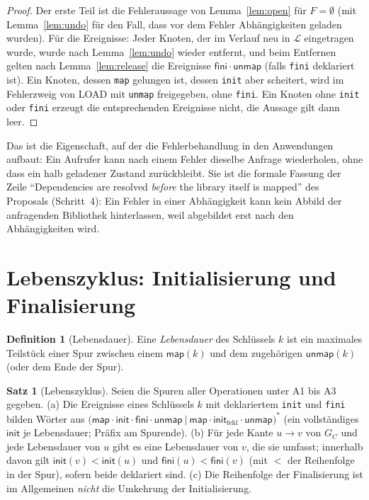 \documentclass[a4paper,12pt,twoside]{report}
\DeclareRobustCommand{\_}{\ifmmode\mbox{\textunderscore}\else\textunderscore\allowbreak{}\fi}
\theoremstyle{definition}
\newtheorem{definition}{Definition}[chapter]
\newtheorem{satz}{Satz}[chapter]
\begin{document}
\begin{proof}
	Der erste Teil ist die Fehleraussage von Lemma~\ref{lem:open} für $F=\emptyset$ (mit Lemma~\ref{lem:undo} für den Fall, dass vor dem Fehler Abhängigkeiten geladen wurden). Für die Ereignisse: Jeder Knoten, der im Verlauf neu in $\mathcal L$ eingetragen wurde, wurde nach Lemma~\ref{lem:undo} wieder entfernt, und beim Entfernen gelten nach Lemma~\ref{lem:release} die Ereignisse $\mathsf{fini}\cdot\mathsf{unmap}$ (falls \texttt{fini} deklariert ist). Ein Knoten, dessen \texttt{map} gelungen ist, dessen \texttt{init} aber scheitert, wird im Fehlerzweig von LOAD mit \texttt{unmap} freigegeben, ohne \texttt{fini}. Ein Knoten ohne \texttt{init} oder \texttt{fini} erzeugt die entsprechenden Ereignisse nicht, die Aussage gilt dann leer.
\end{proof}

Das ist die Eigenschaft, auf der die Fehlerbehandlung in den Anwendungen aufbaut: Ein Aufrufer kann nach einem Fehler dieselbe Anfrage wiederholen, ohne dass ein halb geladener Zustand zurückbleibt. Sie ist die formale Fassung der Zeile ``Dependencies are resolved \emph{before} the library itself is mapped'' des Proposals (Schritt~4): Ein Fehler in einer Abhängigkeit kann kein Abbild der anfragenden Bibliothek hinterlassen, weil abgebildet erst nach den Abhängigkeiten wird.

\section{Lebenszyklus: Initialisierung und Finalisierung}
\label{sec:lebenszyklus}

\begin{definition}[Lebensdauer]
	Eine \emph{Lebensdauer} des Schlüssels $k$ ist ein maximales Teilstück einer Spur zwischen einem $\mathsf{map}(k)$ und dem zugehörigen $\mathsf{unmap}(k)$ (oder dem Ende der Spur).
\end{definition}

\begin{satz}[Lebenszyklus]
	\label{satz:lebenszyklus}
	Seien die Spuren aller Operationen unter A1 bis A3 gegeben. (a) Die Ereignisse eines Schlüssels $k$ mit deklariertem \texttt{init} und \texttt{fini} bilden Wörter aus $\bigl(\mathsf{map}\cdot\mathsf{init}\cdot\mathsf{fini}\cdot\mathsf{unmap}\ \big|\ \mathsf{map}\cdot\mathsf{init}_{\mathrm{fehl}}\cdot\mathsf{unmap}\bigr)^*$ (ein vollständiges $\mathsf{init}$ je Lebensdauer; Präfix am Spurende). (b) Für jede Kante $u\to v$ von $G_C$ und jede Lebensdauer von $u$ gibt es eine Lebensdauer von $v$, die sie umfasst; innerhalb davon gilt $\mathsf{init}(v)<\mathsf{init}(u)$ und $\mathsf{fini}(u)<\mathsf{fini}(v)$ (mit $<$ der Reihenfolge in der Spur), sofern beide deklariert sind. (c) Die Reihenfolge der Finalisierung ist im Allgemeinen \emph{nicht} die Umkehrung der Initialisierung.
\end{satz}
\end{document}
